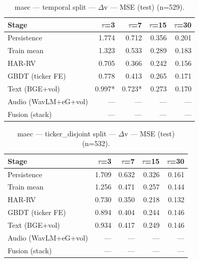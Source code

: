 \begin{table}[t]
\centering
\begin{tabular}{lrrrr}
\toprule
Stage & $\tau$=3 & $\tau$=7 & $\tau$=15 & $\tau$=30 \\
\midrule
Persistence & 1.774 & 0.712 & 0.356 & 0.201 \\
Train mean & 1.323 & 0.533 & 0.289 & 0.183 \\
HAR-RV & 0.705 & 0.366 & 0.242 & 0.156 \\
GBDT (ticker FE) & 0.778 & 0.413 & 0.265 & 0.171 \\
Text (BGE+vol) & 0.997* & 0.723* & 0.273 & 0.170 \\
Audio (WavLM+eG+vol) & — & — & — & — \\
Fusion (stack) & — & — & — & — \\
\bottomrule
\end{tabular}
\caption{maec — temporal split — $\Delta$v — MSE (test) (n=529).}
\end{table}

\begin{table}[t]
\centering
\begin{tabular}{lrrrr}
\toprule
Stage & $\tau$=3 & $\tau$=7 & $\tau$=15 & $\tau$=30 \\
\midrule
Persistence & 1.709 & 0.632 & 0.326 & 0.161 \\
Train mean & 1.256 & 0.471 & 0.257 & 0.144 \\
HAR-RV & 0.730 & 0.350 & 0.218 & 0.132 \\
GBDT (ticker FE) & 0.894 & 0.404 & 0.244 & 0.146 \\
Text (BGE+vol) & 0.934 & 0.417 & 0.249 & 0.146 \\
Audio (WavLM+eG+vol) & — & — & — & — \\
Fusion (stack) & — & — & — & — \\
\bottomrule
\end{tabular}
\caption{maec — ticker\_disjoint split — $\Delta$v — MSE (test) (n=532).}
\end{table}
